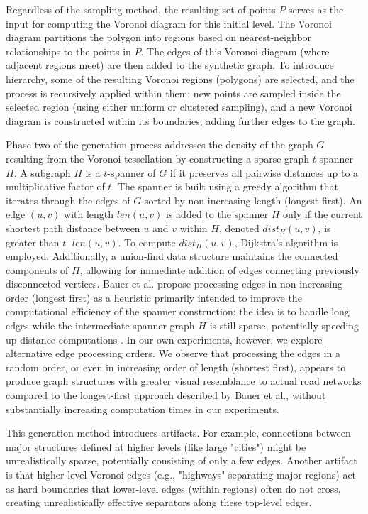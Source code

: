 Regardless of the sampling method, the resulting set of points \(P\) serves as the input for computing the Voronoi diagram for this initial level.
The Voronoi diagram partitions the polygon into regions based on nearest-neighbor relationships to the points in \(P\).
The edges of this Voronoi diagram (where adjacent regions meet) are then added to the synthetic graph.
To introduce hierarchy, some of the resulting Voronoi regions (polygons) are selected, and the process is recursively applied within them: new points are sampled inside the selected region (using either uniform or clustered sampling), and a new Voronoi diagram is constructed within its boundaries, adding further edges to the graph.

Phase two of the generation process addresses the density of the graph \(G\) resulting from the Voronoi tessellation by constructing a sparse graph \(t\)-spanner \(H\).
A subgraph \(H\) is a \(t\)-spanner of \(G\) if it preserves all pairwise distances up to a multiplicative factor of \(t\).
The spanner is built using a greedy algorithm that iterates through the edges of \(G\) sorted by non-increasing length (longest first).
An edge \((u, v)\) with length \(len(u, v)\) is added to the spanner \(H\) only if the current shortest path distance between \(u\) and \(v\) within \(H\), denoted \(dist_H(u, v)\), is greater than \(t \cdot len(u, v)\).
To compute \(dist_H(u, v)\), Dijkstra's algorithm is employed.
Additionally, a union-find data structure maintains the connected components of \(H\), allowing for immediate addition of edges connecting previously disconnected vertices.
Bauer et al. propose processing edges in non-increasing order (longest first) as a heuristic primarily intended to improve the computational efficiency of the spanner construction; the idea is to handle long edges while the intermediate spanner graph \(H\) is still sparse, potentially speeding up distance computations \cite{hutchison_synthetic_2010}.
In our own experiments, however, we explore alternative edge processing orders.
We observe that processing the edges in a random order, or even in increasing order of length (shortest first), appears to produce graph structures with greater visual resemblance to actual road networks compared to the longest-first approach described by Bauer et al., without substantially increasing computation times in our experiments.

This generation method introduces artifacts.
For example, connections between major structures defined at higher levels (like large "cities") might be unrealistically sparse, potentially consisting of only a few edges.
Another artifact is that higher-level Voronoi edges (e.g., "highways" separating major regions) act as hard boundaries that lower-level edges (within regions) often do not cross, creating unrealistically effective separators along these top-level edges.

